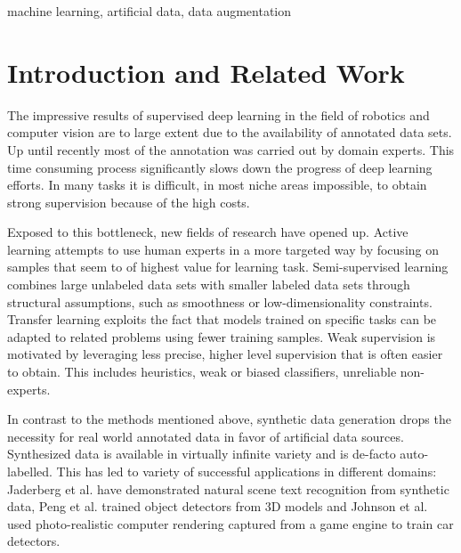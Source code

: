 \documentclass[conference]{IEEEtran}
\begin{document}
\begin{IEEEkeywords}
machine learning, artificial data, data augmentation
\end{IEEEkeywords}

\section{Introduction and Related Work}
The impressive results of supervised deep learning in the field of robotics and computer vision are to large extent due to the availability of annotated data sets. Up until recently most of the annotation was carried out by domain experts. This time consuming process significantly slows down the progress of deep learning efforts. In many tasks it is difficult, in most niche areas impossible, to obtain strong supervision because of the high costs.

Exposed to this bottleneck, new fields of research have opened up. Active learning \cite{druck2009active, settles2012active, cakmak2012designing} attempts to use human experts in a more targeted way by focusing on samples that seem to of highest value for learning task. Semi-supervised learning \cite{chapelle2009semi, salimans2016improved, zhu2006semi} combines large unlabeled data sets with smaller labeled data sets through structural assumptions, such as smoothness or low-dimensionality constraints. Transfer learning \cite{pratt1993discriminability, ventura2007theoretical, pan2010survey} exploits the fact that models trained on specific tasks can be adapted to related problems using fewer training samples. Weak supervision \cite{ratner2016data, zhou2017brief} is motivated by leveraging less precise, higher level supervision that is often easier to obtain. This includes heuristics, weak or biased classifiers, unreliable non-experts. 


In contrast to the methods mentioned above, synthetic data generation drops the necessity for real world annotated data in favor of artificial data sources. Synthesized data is available in virtually infinite variety and is de-facto auto-labelled. This has led to variety of successful applications in different domains: Jaderberg et al. \cite{jaderberg2014synthetic} have demonstrated natural scene text recognition from synthetic data, Peng et al. \cite{peng2015learning} trained object detectors from 3D models and Johnson et al. \cite{2017_Johnson_DrivingInTheMatrix} used photo-realistic computer rendering captured from a game engine to train car detectors. 
\end{document}
